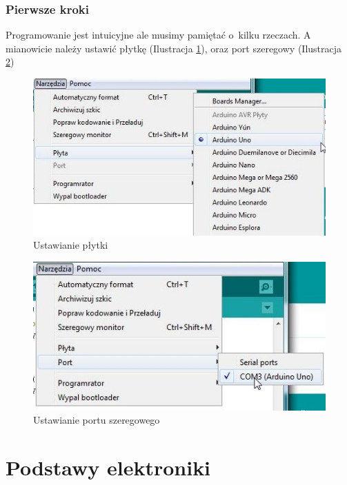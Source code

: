 \documentclass[a4paper,12pt, twoside]{article}
\let\oldsection\section		%
\renewcommand\section{\clearpage\oldsection}%
\begin{document}
\subsubsection{Pierwsze kroki}
Programowanie jest intuicyjne ale musimy pamiętać o~kilku rzeczach. A mianowicie należy ustawić płytkę (Ilustracja \ref{fig:plytka}), oraz port szeregowy (Ilustracja \ref{fig:port})%


\begin{figure}[h]  
  \centering
  \includegraphics[scale=0.7]{arduino-ustawPlytke.jpg}
  \caption{Ustawianie płytki}
  \label{fig:plytka}
	\end{figure}
	\begin{figure}[h]
  \centering
  \includegraphics[scale=0.7]{arduino-ustawPort.jpg}
  \caption{Ustawianie portu szeregowego}
  \label{fig:port}
\end{figure}



\cite{Introduction, Reference}



\section{Podstawy elektroniki}
\end{document}
